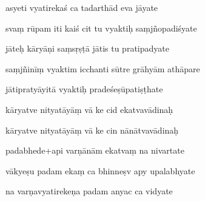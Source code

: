 \documentclass[article,12pt,a4paper]{memoir}%
\newcounter{parCount}
\begin{document}
	  
	  \pstart \leavevmode%
	asyeti vyatirekaś ca tadarthād eva jāyate 
	{}
	\pend%
      

	  
	  \pstart {} svaṃ rūpam iti kaiś cit tu vyaktiḥ saṃjñopadiśyate 
	{}
	\pend%
      

	  
	  \pstart \leavevmode%
	jāteḥ kāryāṇi saṃsṛṣṭā jātis tu pratipadyate 
	{}
	\pend%
      

	  
	  \pstart {} saṃjñinīṃ vyaktim icchanti sūtre grāhyām athāpare 
	{}
	\pend%
      

	  
	  \pstart \leavevmode%
	jātipratyāyitā vyaktiḥ pradeśeṣūpatiṣṭhate 
	{}
	\pend%
      

	  
	  \pstart {} kāryatve nityatāyāṃ vā ke cid ekatvavādinaḥ 
	{}
	\pend%
      

	  
	  \pstart \leavevmode%
	kāryatve nityatāyāṃ vā ke cin nānātvavādinaḥ 
	{}
	\pend%
      

	  
	  \pstart {} padabhede+api varṇānām ekatvaṃ na nivartate 
	{}
	\pend%
      

	  
	  \pstart \leavevmode%
	vākyeṣu padam ekaṃ ca bhinneṣv apy upalabhyate 
	{}
	\pend%
      

	  
	  \pstart {} na varṇavyatirekeṇa padam anyac ca vidyate 
	{}
	\pend%
      
\end{document}
